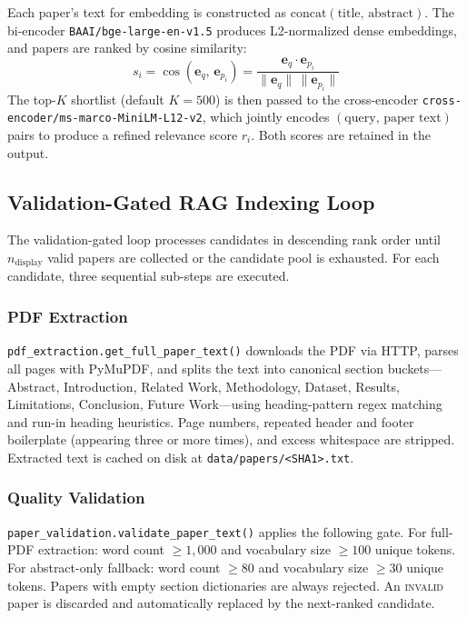 \documentclass[conference]{IEEEtran}
\begin{document}
Each paper's text for embedding is constructed as
$\mathrm{concat}(\text{title},\, \text{abstract})$.
The bi-encoder \texttt{BAAI/bge-large-en-v1.5} produces
L2-normalized dense embeddings, and papers are ranked by cosine similarity:
\begin{equation}
    s_i = \cos(\mathbf{e}_q,\, \mathbf{e}_{p_i})
        = \frac{\mathbf{e}_q \cdot \mathbf{e}_{p_i}}
               {\|\mathbf{e}_q\|\,\|\mathbf{e}_{p_i}\|}
\label{eq:cosine}
\end{equation}
The top-$K$ shortlist (default $K{=}500$) is then passed to the
cross-encoder \texttt{cross-encoder/ms-marco-MiniLM-L12-v2}, which jointly
encodes $(\text{query},\, \text{paper text})$ pairs to produce a refined
relevance score $r_i$. Both scores are retained in the output.

\subsection{Validation-Gated RAG Indexing Loop}

The validation-gated loop processes candidates in descending rank order
until $n_{\text{display}}$ valid papers are collected or the candidate pool
is exhausted. For each candidate, three sequential sub-steps are executed.

\subsubsection{PDF Extraction}
\texttt{pdf\_extraction.get\_full\_paper\_text()} downloads the PDF via
HTTP, parses all pages with PyMuPDF, and splits the text into canonical
section buckets---Abstract, Introduction, Related Work, Methodology, Dataset,
Results, Limitations, Conclusion, Future Work---using heading-pattern regex
matching and run-in heading heuristics. Page numbers, repeated header and
footer boilerplate (appearing three or more times), and excess whitespace
are stripped. Extracted text is cached on disk at
\texttt{data/papers/<SHA1>.txt}.

\subsubsection{Quality Validation}
\texttt{paper\_validation.validate\_paper\_text()} applies the following gate.
For full-PDF extraction: word count $\ge 1{,}000$ and vocabulary size
$\ge 100$ unique tokens. For abstract-only fallback: word count $\ge 80$
and vocabulary size $\ge 30$ unique tokens. Papers with empty section
dictionaries are always rejected. An \textsc{invalid} paper is discarded and
automatically replaced by the next-ranked candidate.
\end{document}
